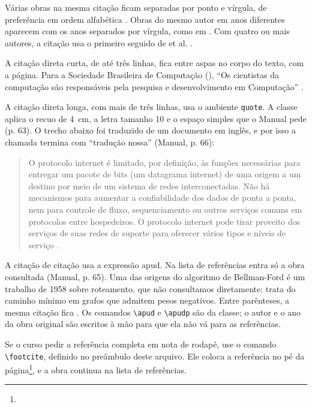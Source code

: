 \documentclass[tcc,capa]{texufpel}
\newcommand{\footcite}[1]{\footnote{\bibentry{#1}}}
\begin{document}
Várias obras na mesma citação ficam separadas por ponto e vírgula, de
preferência em ordem alfabética \citep{Hoare:1969:ABC,Lamport:1978:TCO}.
Obras do mesmo autor em anos diferentes aparecem com os anos separados por
vírgula, como em \citet{Turing:1937:OCN,Turing:1950:CMI}. Com quatro ou mais
autores, a citação usa o primeiro seguido de et al. \citep{Cormen:2022:IA}.

A citação direta curta, de até três linhas, fica entre aspas no corpo do
texto, com a página. Para a Sociedade Brasileira de Computação
(), ``Os cientistas da
computação são responsáveis pela pesquisa e desenvolvimento em Computação''
\citep[p.~30]{Zorzo:2017:RFC}.

A citação direta longa, com mais de três linhas, usa o ambiente
\texttt{quote}. A classe aplica o recuo de 4~cm, a letra tamanho 10 e o espaço
simples que o Manual pede (p. 63). O trecho abaixo foi traduzido de um
documento em inglês, e por isso a chamada termina com ``tradução nossa''
(Manual, p. 66):

\begin{quote}
O protocolo internet é limitado, por definição, às funções necessárias para
entregar um pacote de bits (um datagrama internet) de uma origem a um destino
por meio de um sistema de redes interconectadas. Não há mecanismos para
aumentar a confiabilidade dos dados de ponta a ponta, nem para controle de
fluxo, sequenciamento ou outros serviços comuns em protocolos entre
hospedeiros. O protocolo internet pode tirar proveito dos serviços de suas
redes de suporte para oferecer vários tipos e níveis de serviço
\citep[p.~1, tradução nossa]{Postel:1981:IP}.
\end{quote}

A citação de citação usa a expressão apud. Na lista de referências entra só a
obra consultada (Manual, p. 65). Uma das origens do algoritmo de Bellman-Ford é um
trabalho de 1958 sobre roteamento, que não consultamos diretamente:
 trata do caminho mínimo em grafos que
admitem pesos negativos. Entre parênteses, a mesma citação fica
. Os comandos \verb|\apud| e
\verb|\apudp| são da classe; o autor e o ano da obra original são escritos à
mão para que ela não vá para as referências.

Se o curso pedir a referência completa em nota de rodapé, use o comando
\verb|\footcite|, definido no preâmbulo deste arquivo. Ele coloca a referência
no pé da página\footcite{Postel:1981:IP}, e a obra continua na lista de
referências.
\end{document}
